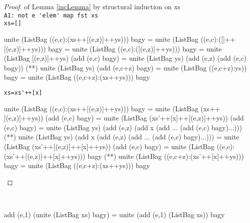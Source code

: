 \begin{proof} of Lemma \ref{incLemma} by structural induction on xs\\
\verb|A1: not e 'elem' map fst xs|\\
\verb|xs=[]|
\begin{code}
unite (ListBag ((e,c):(xs++[(e,z)]++ys))) bagy 
                 = unite (ListBag ((e,c):([]++[(e,z)]++ys))) bagy
                 = unite (ListBag ((e,c):([(e,z)]++ys))) bagy
                 = unite (ListBag [(e,z)]++ys) (add (e,c) bagy)
                 = unite (ListBag ys) (add (e,z) (add (e,c) bagy))
                 (*\sEq{\ref{addSameLemma}}*) unite (ListBag ys) (add (e,c+z) bagy)
                 = unite (ListBag ((e,c+z):ys)) bagy
                 = unite (ListBag ((e,c+z):(xs++ys))) bagy
\end{code}
\verb|xs=xs'++[x]|
\begin{code}
unite (ListBag ((e,c):(xs++[(e,z)]++ys))) bagy 
                 = unite (ListBag (xs++[(e,z)]++ys)) (add (e,c) bagy)
                 = unite (ListBag (xs'++[x]++[(e,z)]++ys)) (add (e,c) bagy)
                 = unite (ListBag ys) (add (e,z) (add x (add ... (add (e,c) bagy)...)))
                 (*\sEq{\ref{addDiffLemma}}*) unite (ListBag ys) (add x (add (e,z) (add ... (add (e,c) bagy)...)))
                 = unite (ListBag (xs'++[(e,z)]++[x]++ys)) (add (e,c) bagy)
                 = unite (ListBag ((e,c):(xs'++[(e,z)]++[x]++ys))) bagy
                 (**) unite (ListBag ((e,c+z):(xs'++[x]++ys))) bagy
                 = unite (ListBag ((e,c+z):(xs++ys))) bagy
\end{code}
\end{proof}
\begin{lemma}\label{addLemma}\ 
\begin{code}
add (e,1) (unite (ListBag xs) bagy)
                 = unite (add (e,1) (ListBag xs)) bagy
\end{code}
\end{lemma}
